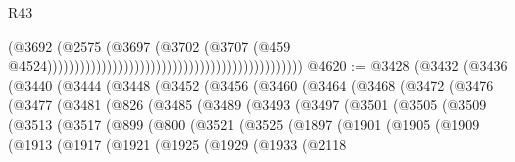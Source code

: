 \begin{lexlean}{R43}
\begin{coremodule}
                                                                                      (@3692
                                                                                        (@2575
                                                                                          (@3697
                                                                                            (@3702
                                                                                              (@3707
                                                                                                (@459
                                                                                                  @4524)))))))))))))))))))))))))))))))))))))))))))))))
@4620 := @3428
    (@3432
      (@3436
        (@3440
          (@3444
            (@3448
              (@3452
                (@3456
                  (@3460
                    (@3464
                      (@3468
                        (@3472
                          (@3476
                            (@3477
                              (@3481
                                (@826
                                  (@3485
                                    (@3489
                                      (@3493
                                        (@3497
                                          (@3501
                                            (@3505
                                              (@3509
                                                (@3513
                                                  (@3517
                                                    (@899
                                                      (@800
                                                        (@3521
                                                          (@3525
                                                            (@1897
                                                              (@1901
                                                                (@1905
                                                                  (@1909
                                                                    (@1913
                                                                      (@1917
                                                                        (@1921
                                                                          (@1925
                                                                            (@1929
                                                                              (@1933
                                                                                (@2118

\end{coremodule}
\end{lexlean}
